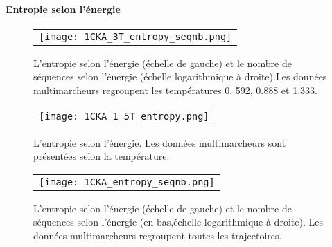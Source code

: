     \clearpage

   \paragraph{Entropie selon l'énergie}

    \begin{figure}[h]
      \centering
      \begin{tabular}{c} 
        \texttt{[image: 1CKA\_3T\_entropy\_seqnb.png]} \\
      \end{tabular}
        
      \caption{L'entropie selon l'énergie (échelle  de gauche) et le nombre de séquences selon l'énergie (échelle logarithmique à droite).Les données multimarcheurs regroupent les températures 0. 592, 0.888 et 1.333. }
\label{graph:entropie_seqnb_3T}
    \end{figure}


    \begin{figure}[h]
      \centering
      \begin{tabular}{c} 
        \texttt{[image: 1CKA\_1\_5T\_entropy.png]} \\
      \end{tabular}
        
      \caption{L'entropie selon l'énergie. Les données multimarcheurs sont présentées selon la température.}
\label{graph:entropie_energie}
    \end{figure}


    \begin{figure}[h]
      \centering
      \begin{tabular}{c} 
        \texttt{[image: 1CKA\_entropy\_seqnb.png]} \\
      \end{tabular}
        
      \caption{L'entropie selon l'énergie (échelle de gauche) et le nombre de séquences selon l'énergie (en bas,échelle logarithmique à droite). Les données multimarcheurs regroupent toutes les trajectoires. }
\label{graph:entropie_seqnb_AllT}
    \end{figure}


    \clearpage

